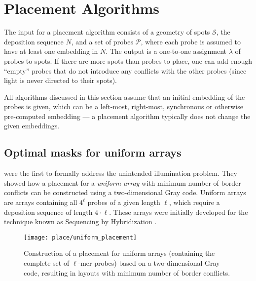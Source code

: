 \chapter{Placement Algorithms}
\label{ch:placement}

The input for a placement algorithm consists of a geometry of spots
$\mathcal{S}$, the deposition sequence $N$, and a set of probes $\mathcal{P}$,
where each probe is assumed to have at least one embedding in $N$. The output is
a one-to-one assignment $\lambda$ of probes to spots. If there are more spots
than probes to place, one can add enough ``empty'' probes that do not introduce
any conflicts with the other probes (since light is never directed to their
spots).

All algorithms discussed in this section assume that an initial embedding of the
probes is given, which can be a left-most, right-most, synchronous or otherwise
pre-computed embedding --- a placement algorithm typically does not change the
given embeddings.

\section{Optimal masks for uniform arrays}
\label{sec:placement_uniform}

\citet{Feldman1994} were the first to formally address the unintended
illumination problem. They showed how a placement for a \emph{uniform array}
with minimum number of border conflicts can be constructed using a
two-dimensional Gray code. Uniform arrays are arrays containing all $4^\ell$
probes of a given length $\ell$, which require a deposition sequence of length
$4\cdot \ell$. These arrays were initially developed for the technique known as
Sequencing by Hybridization \citep{Southern1992}.

\begin{figure}[t]\centering
\texttt{[image: place/uniform\_placement]}
\caption{\label{fig:uniform_placement}%
  Construction of a placement for uniform arrays (containing the complete set of
  $\ell$-mer probes) based on a two-dimensional Gray code, resulting in layouts
  with minimum number of border conflicts.}
\end{figure}

